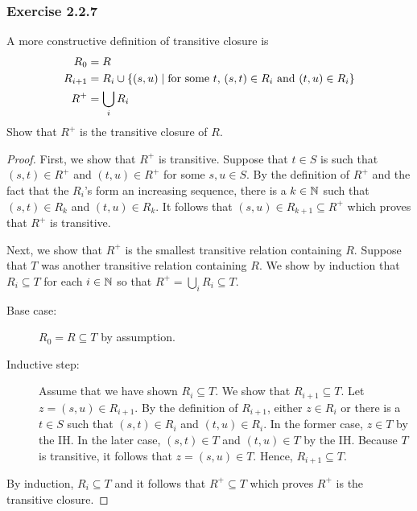 \subsubsection*{Exercise 2.2.7}
A more constructive definition of transitive closure is
\begin{align*}
    R_0 &= R  \\
    R_{i+1} &= R_i \cup \{(s, u)\mid\text{for some $t$, $(s, t) \in R_i$ and $(t, u) \in R_i$}\} \\
    R^+ &= \bigcup_i R_i
\end{align*}
Show that $R^+$ is the transitive closure of $R$.
\begin{proof}
First, we show that $R^+$ is transitive.  Suppose that $t \in S$ is such that $(s, t) \in R^+$ and $(t, u) \in R^+$ for some $s, u \in S$.  By the definition of $R^+$ and the fact that the $R_i$'s form an increasing sequence, there is a $k \in \mathbb{N}$ such that $(s, t) \in R_k$ and $(t, u) \in R_k$.  It follows that $(s, u) \in R_{k+1} \subseteq R^+$ which proves that $R^+$ is transitive.

Next, we show that $R^+$ is the smallest transitive relation containing $R$.  Suppose that $T$ was another
transitive relation containing $R$.  We show by induction that $R_i \subseteq T$ for each $i \in \mathbb{N}$ so that $R^+ = \bigcup_i R_i \subseteq T$.  
\begin{description}
    \item[Base case:] $R_0 = R \subseteq T$ by assumption.
    \item[Inductive step:] Assume that we have shown $R_i \subseteq T$.  We show that $R_{i+1} \subseteq T$.  Let $z = (s, u) \in R_{i+1}$.  By the definition of $R_{i+1}$, either $z \in R_i$ or there is a 
$t \in S$ such that $(s, t) \in R_i$ and $(t, u) \in R_i$.  In the former case, $z \in T$ by the IH.  In the later case,
$(s, t) \in T$ and $(t, u) \in T$ by the IH.  Because $T$ is transitive, it follows that $z = (s, u) \in T$.  Hence, $R_{i+1} \subseteq T$.
\end{description}
By induction, $R_i \subseteq T$ and it follows that $R^+ \subseteq T$ which proves $R^+$ is the transitive closure.
\end{proof}


